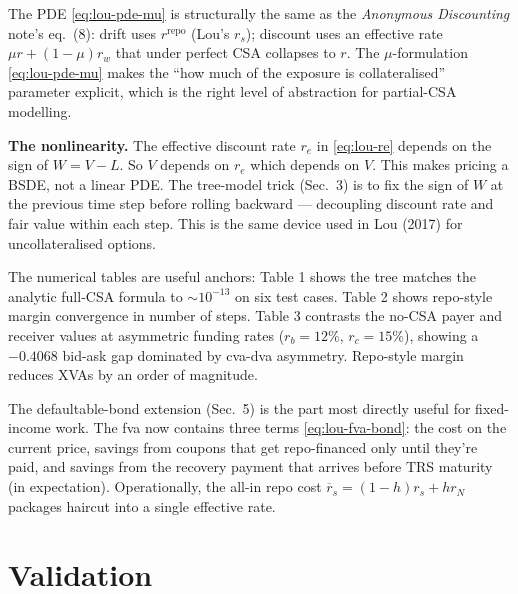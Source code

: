 \documentclass[11pt,a4paper]{article}
\begin{document}
\begin{commentary}
The PDE \eqref{eq:lou-pde-mu} is structurally the same as the
\emph{Anonymous Discounting} note's eq.~(8): drift uses
$r^{\text{repo}}$ (Lou's $r_s$); discount uses an effective rate
$\mu r + (1-\mu) r_w$ that under perfect CSA collapses to $r$. The
$\mu$-formulation \eqref{eq:lou-pde-mu} makes the
``how much of the exposure is collateralised'' parameter explicit,
which is the right level of abstraction for partial-CSA modelling.
\end{commentary}

\begin{commentary}
\textbf{The nonlinearity.} The effective discount rate $r_e$ in
\eqref{eq:lou-re} depends on the sign of $W = V - L$. So $V$ depends
on $r_e$ which depends on $V$. This makes pricing a BSDE, not a
linear PDE. The tree-model trick (Sec.\ 3) is to fix the sign of $W$
at the previous time step before rolling backward --- decoupling
discount rate and fair value within each step. This is the same
device used in Lou (2017) for uncollateralised options.
\end{commentary}

\begin{commentary}
The numerical tables are useful anchors: Table 1 shows the tree
matches the analytic full-CSA formula to $\sim 10^{-13}$ on six test
cases. Table 2 shows repo-style margin convergence in number of
steps. Table 3 contrasts the no-CSA payer and receiver values at
asymmetric funding rates ($r_b = 12\%$, $r_c = 15\%$), showing a
$-0.4068$ bid-ask gap dominated by cva-dva asymmetry. Repo-style
margin reduces XVAs by an order of magnitude.
\end{commentary}

\begin{commentary}
The defaultable-bond extension (Sec.\ 5) is the part most directly
useful for fixed-income work. The fva now contains three terms
\eqref{eq:lou-fva-bond}: the cost on the current price, savings from
coupons that get repo-financed only until they're paid, and savings
from the recovery payment that arrives before TRS maturity (in
expectation). Operationally, the all-in repo cost
$\overline r_s = (1 - h) r_s + h r_N$ packages haircut into a single
effective rate.
\end{commentary}

\section{Validation}
\end{document}
